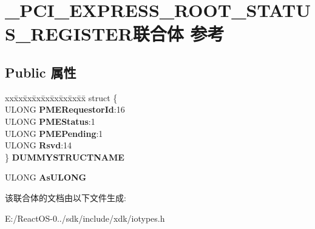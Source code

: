 \hypertarget{union___p_c_i___e_x_p_r_e_s_s___r_o_o_t___s_t_a_t_u_s___r_e_g_i_s_t_e_r}{}\section{\+\_\+\+P\+C\+I\+\_\+\+E\+X\+P\+R\+E\+S\+S\+\_\+\+R\+O\+O\+T\+\_\+\+S\+T\+A\+T\+U\+S\+\_\+\+R\+E\+G\+I\+S\+T\+E\+R联合体 参考}
\label{union___p_c_i___e_x_p_r_e_s_s___r_o_o_t___s_t_a_t_u_s___r_e_g_i_s_t_e_r}
\subsection*{Public 属性}
\begin{DoxyCompactItemize}
\item 
\mbox{\label{union___p_c_i___e_x_p_r_e_s_s___r_o_o_t___s_t_a_t_u_s___r_e_g_i_s_t_e_r_a6e7bddc107426b4901b07ba2877d4d6d}} 
\begin{tabbing}
xx\=xx\=xx\=xx\=xx\=xx\=xx\=xx\=xx\=\kill
struct \{\\
\>ULONG {\bfseries PMERequestorId}:16\\
\>ULONG {\bfseries PMEStatus}:1\\
\>ULONG {\bfseries PMEPending}:1\\
\>ULONG {\bfseries Rsvd}:14\\
\} {\bfseries DUMMYSTRUCTNAME}\\

\end{tabbing}\item 
\mbox{\label{union___p_c_i___e_x_p_r_e_s_s___r_o_o_t___s_t_a_t_u_s___r_e_g_i_s_t_e_r_a727a41b58524ae916102d755dec1637f}} 
U\+L\+O\+NG {\bfseries As\+U\+L\+O\+NG}
\end{DoxyCompactItemize}


该联合体的文档由以下文件生成\+:\begin{DoxyCompactItemize}
\item 
E\+:/\+React\+O\+S-\/0../sdk/include/xdk/iotypes.\+h\end{DoxyCompactItemize}
